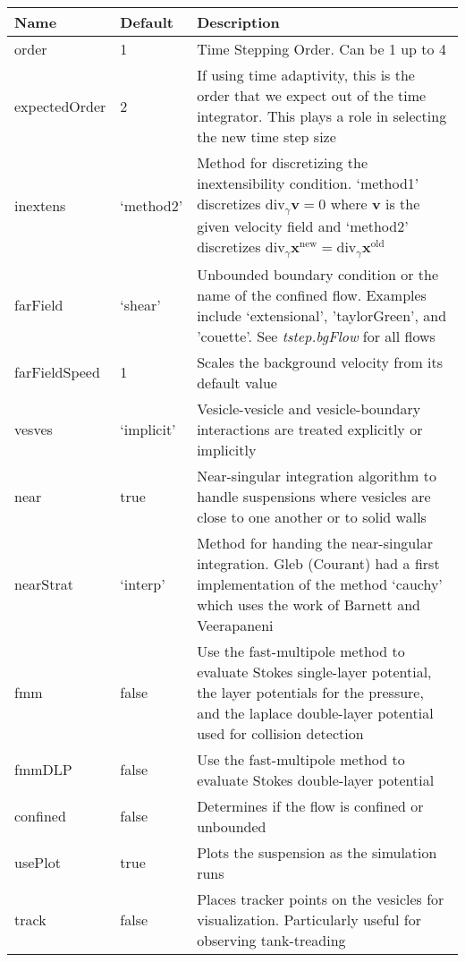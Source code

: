 \documentclass[12pt]{article}
\newcommand{\xx}{{\mathbf{x}}}
\begin{document}
\begin{longtable}{|l|l|m{6cm}|}
\hline
Name & Default & Description \\ \hline
order & 1 & 
Time Stepping Order.  Can be 1 up to 4 \\  \hline
expectedOrder & 2 & 
If using time adaptivity, this is the order that we expect out of the
time integrator.  This plays a role in selecting the new time step size
\\ \hline
inextens & `method2' &  
Method for discretizing the inextensibility condition.  `method1'
discretizes $\mathrm{div}_{\gamma} \mathbf{v} = 0$ where $\mathbf{v}$ is
the given velocity field and `method2' discretizes
$\mathrm{div}_{\gamma} \xx^{\mathrm{new}} = \mathrm{div}_{\gamma}
\xx^{\mathrm{old}}$ \\ \hline
farField & `shear' &
Unbounded boundary condition or the name of the confined flow.
Examples include `extensional', 'taylorGreen', and 'couette'.  See
\emph{tstep.bgFlow} for all flows \\ \hline
farFieldSpeed & 1 & 
Scales the background velocity from its default value \\ \hline
vesves & `implicit' &  
Vesicle-vesicle and vesicle-boundary interactions are treated explicitly
or implicitly \\ \hline
near & true & 
Near-singular integration algorithm to handle suspensions where vesicles
are close to one another or to solid walls \\ \hline
nearStrat & `interp' &
Method for handing the near-singular integration.  Gleb (Courant) had
a first implementation of the method `cauchy' which uses the work of
Barnett and Veerapaneni \\ \hline
fmm & false &
Use the fast-multipole method to evaluate Stokes single-layer potential,
the layer potentials for the pressure, and the laplace double-layer
potential used for collision detection \\ \hline
fmmDLP & false &
Use the fast-multipole method to evaluate Stokes double-layer potential
\\ \hline
confined & false &
Determines if the flow is confined or unbounded \\ \hline
usePlot & true &
Plots the suspension as the simulation runs \\ \hline
track & false &  
Places tracker points on the vesicles for visualization.  Particularly
useful for observing tank-treading \\ \hline

\end{longtable}
\end{document}
